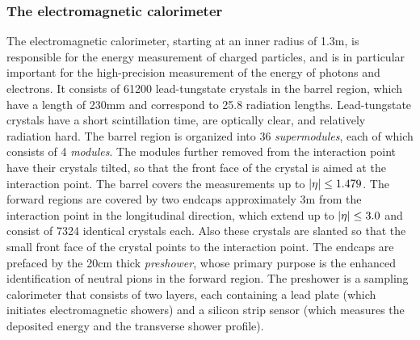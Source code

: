 \subsubsection{The electromagnetic calorimeter}

The electromagnetic calorimeter, starting at an inner radius of 1.3\unit{m}, is responsible for the energy measurement of charged particles, and is in particular important for the high-precision measurement of the energy of photons and electrons.
% 
It consists of 61200 lead-tungstate crystals in the barrel region, which have a length of 230\unit{mm} and correspond to 25.8 radiation lengths.
% 
Lead-tungstate crystals have a short scintillation time, are optically clear, and relatively radiation hard.
% 
The barrel region is organized into 36 \textit{supermodules}, each of which consists of 4 \textit{modules}.
% 
The modules further removed from the interaction point have their crystals tilted, so that the front face of the crystal is aimed at the interaction point.
% 
The barrel covers the measurements up to $\left| \eta \right | \leq 1.479$.
% 
The forward regions are covered by two endcaps approximately 3\unit{m} from the interaction point in the longitudinal direction, which extend up to $\left| \eta \right | \leq 3.0$ and consist of 7324 identical crystals each.
% 
Also these crystals are slanted so that the small front face of the crystal points to the interaction point.
% 
The endcaps are prefaced by the 20\unit{cm} thick \textit{preshower}, whose primary purpose is the enhanced identification of neutral pions in the forward region.
% 
The preshower is a sampling calorimeter that consists of two layers, each containing a lead plate (which initiates electromagnetic showers) and a silicon strip sensor (which measures the deposited energy and the transverse shower profile).


